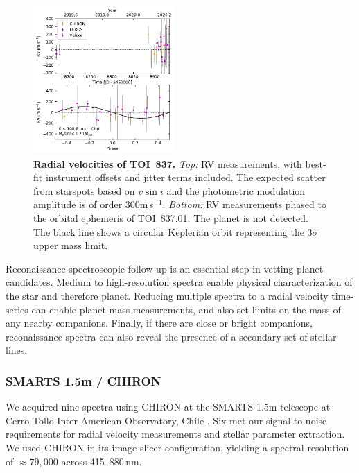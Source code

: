 \documentclass[12pt,twocolumn,tighten]{aastex63}
\newcommand{\tn}{TOI~837} %
\newcommand{\pn}{TOI~837.01} %
\begin{document}
\begin{figure}[!t]
	\begin{center}
		\leavevmode
		\includegraphics[width=0.48\textwidth]{f3.pdf}
	\end{center}
	\vspace{-0.7cm}
	\caption{
		{\bf Radial velocities of \tn.}
		{\it Top:} RV measurements, with best-fit instrument offsets
    and jitter terms included.  The expected scatter from starspots
    based on $v\sin i$ and the photometric modulation amplitude is of
    order 300m$\,$s$^{-1}$.
		{\it Bottom:}
    RV measurements phased to the orbital ephemeris of \pn.  The
    planet is not detected.  The black line shows a circular
    Keplerian orbit representing the $3\sigma$ upper mass limit.
		\label{fig:rvs}
	}
\end{figure}

Reconaissance spectroscopic follow-up is an essential step in vetting
planet candidates.  Medium to high-resolution spectra enable physical
characterization of the star and therefore planet.  Reducing multiple
spectra to a radial velocity time-series can enable planet mass
measurements, and also set limits on the mass of any nearby
companions.  Finally, if there are close or bright companions,
reconaissance spectra can also reveal the presence of a secondary set
of stellar lines.

\subsubsection{SMARTS 1.5m / CHIRON}
\label{subsec:chiron}

We acquired nine spectra using CHIRON at the SMARTS 1.5m telescope at
Cerro Tollo Inter-American Observatory, Chile
\citep{tokovinin_chironfiber_2013}.  Six met our signal-to-noise
requirements for radial velocity measurements and stellar parameter
extraction.  We used CHIRON in its image slicer configuration,
yielding a spectral resolution of $\approx 79{,}000$ across
415--880$\,$nm.
\end{document}
